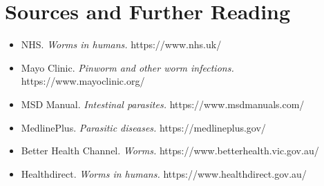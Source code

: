 \section*{Sources and Further Reading}
\begin{itemize}
    \item NHS. \textit{Worms in humans.} https://www.nhs.uk/
    \item Mayo Clinic. \textit{Pinworm and other worm infections.} https://www.mayoclinic.org/
    \item MSD Manual. \textit{Intestinal parasites.} https://www.msdmanuals.com/
    \item MedlinePlus. \textit{Parasitic diseases.} https://medlineplus.gov/
    \item Better Health Channel. \textit{Worms.} https://www.betterhealth.vic.gov.au/
    \item Healthdirect. \textit{Worms in humans.} https://www.healthdirect.gov.au/
\end{itemize}
